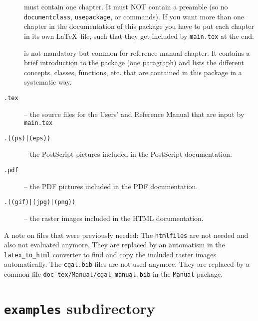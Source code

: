 \begin{description}
 \item[]%
       must contain one chapter. It must NOT 
      contain a preamble (so no {\tt documentclass}, {\tt usepackage}, 
      \verb|| or \verb|| commands). 
      If you want more than one chapter in the documentation of this
      package you have to put each chapter in its own \LaTeX\ file,
      such that they get included by \texttt{main.tex} at the end.
 \item[]%
      is not mandatory but common for reference manual chapter. It
      contains a brief introduction to the package (one paragraph) and
      lists the different concepts, classes, functions, etc. that are
      contained in this package in a systematic way.
 \item[{\tt *.tex}] -- the source files for the Users' and Reference
      Manual that are input by {\tt main.tex} 
 \item[{\tt *.((ps)|(eps))}] -- the PostScript pictures included in
        the PostScript documentation.
 \item[{\tt *.pdf}] -- the PDF pictures included in
        the PDF documentation.
 \item[{\tt *.((gif)|(jpg)|(png))}] -- the raster images included in
        the HTML documentation.
\end{description}

A note on files that were previously needed: The \texttt{htmlfiles} are
not needed and also not evaluated anymore. They are replaced by an
automatism in the \texttt{latex\_to\_html} converter to find and copy
the included raster images automatically. The \texttt{cgal.bib} files
are not used anymore. They are replaced by a common file
\texttt{doc\_tex/Manual/cgal\_manual.bib}  in the \texttt{Manual} package.

\section{{\tt examples} subdirectory}
\label{sec:examples_subdirectory}

